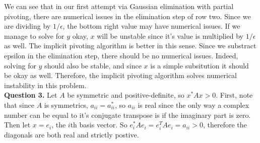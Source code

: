 \documentclass{article}
\begin{document}
We can see that in our first attempt via Gaussian elimination with partial pivoting, there are numerical issues in the elimination step of row two. Since we are dividing by $1/\epsilon$, the bottom right value may have numerical issues. If we manage to solve for $y$ okay, $x$ will be unstable since it's value is multiplied by $1/\epsilon$ as well. The implicit pivoting algorithm is better in this sense. Since we substract epsilon in the elimination step, there should be no numerical issues. Indeed, solving for $y$ should also be stable, and since $x$ is a simple subsitution it should be okay as well. Therefore, the implicit pivoting algorithm solves numerical instability in this problem.\\

\textbf{Question 3.} Let $A$ be symmetric and positive-definite, so $x^*Ax > 0$. First, note that since $A$ is symmetrics, $a_{ii}=a_{ii}^*$, so $a_{ii}$ is real since the only way a complex number can be equal to it's conjugate transpose is if the imaginary part is zero. Then let $x=e_i$, the $i$th basis vector. So $e_i^* A e_i = e_i^T A e_i = a_{ii} > 0$, therefore the diagonals are both real and strictly postive. \\
\end{document}
